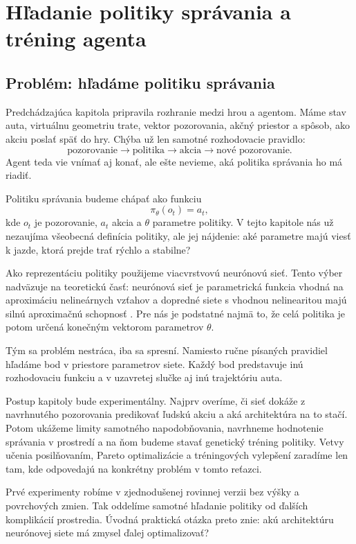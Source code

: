 \chapter[Hľadanie politiky správania]{Hľadanie politiky správania a tréning agenta}

\section{Problém: hľadáme politiku správania}

Predchádzajúca kapitola pripravila rozhranie medzi hrou a agentom. Máme stav auta, virtuálnu geometriu trate, vektor pozorovania, akčný priestor a spôsob, ako akciu poslať späť do hry. Chýba už len samotné rozhodovacie pravidlo:
\[
    \text{pozorovanie} \rightarrow \text{politika} \rightarrow \text{akcia} \rightarrow \text{nové pozorovanie}.
\]
Agent teda vie vnímať aj konať, ale ešte nevieme, aká politika správania ho má riadiť.

Politiku správania budeme chápať ako funkciu
\[
    \pi_{\theta}(o_t) = a_t,
\]
kde \(o_t\) je pozorovanie, \(a_t\) akcia a \(\theta\) parametre politiky. V tejto kapitole nás už nezaujíma všeobecná definícia politiky, ale jej nájdenie: aké parametre majú viesť k jazde, ktorá prejde trať rýchlo a stabilne?

Ako reprezentáciu politiky použijeme viacvrstvovú neurónovú sieť. Tento výber nadväzuje na teoretickú časť: neurónová sieť je parametrická funkcia vhodná na aproximáciu nelineárnych vzťahov \cite{goodfellow2016deep} a dopredné siete s vhodnou nelinearitou majú silnú aproximačnú schopnosť \cite{cybenko1989approximation}. Pre nás je podstatné najmä to, že celá politika je potom určená konečným vektorom parametrov \(\theta\).

Tým sa problém nestráca, iba sa spresní. Namiesto ručne písaných pravidiel hľadáme bod v priestore parametrov siete. Každý bod predstavuje inú rozhodovaciu funkciu a v uzavretej slučke aj inú trajektóriu auta.

Postup kapitoly bude experimentálny. Najprv overíme, či sieť dokáže z navrhnutého pozorovania predikovať ľudskú akciu a aká architektúra na to stačí. Potom ukážeme limity samotného napodobňovania, navrhneme hodnotenie správania v prostredí a na ňom budeme stavať genetický tréning politiky. Vetvy učenia posilňovaním, Pareto optimalizácie a tréningových vylepšení zaradíme len tam, kde odpovedajú na konkrétny problém v tomto reťazci.

Prvé experimenty robíme v zjednodušenej rovinnej verzii \Trackmania{} bez výšky a povrchových zmien. Tak oddelíme samotné hľadanie politiky od ďalších komplikácií prostredia. Úvodná praktická otázka preto znie: akú architektúru neurónovej siete má zmysel ďalej optimalizovať?

